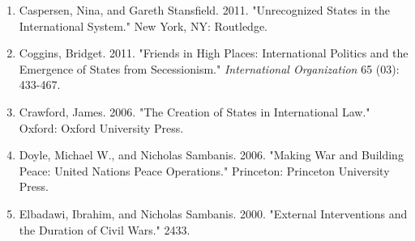 \documentclass[11pt,letterpaper, notitlepage]{article}
\begin{document}
\begin{enumerate}[1.]
\item \hangindent=1cm Caspersen, Nina, and Gareth Stansfield. 2011. "Unrecognized States in the International System." New York, NY: Routledge.


\item \hangindent=1cm Coggins, Bridget. 2011. "Friends in High Places: International Politics and the Emergence of States from Secessionism." \emph {International Organization} 65 (03): 433-467.



\item \hangindent=1cm Crawford, James. 2006. "The Creation of States in International Law." Oxford: Oxford University Press.


\item \hangindent=1cm Doyle, Michael W., and Nicholas Sambanis. 2006. "Making War and Building Peace: United Nations Peace Operations." Princeton: Princeton University Press.

\item \hangindent=1cm Elbadawi, Ibrahim, and Nicholas Sambanis. 2000. "External Interventions and the Duration of Civil Wars." 2433.




\end{enumerate}
\end{document}
